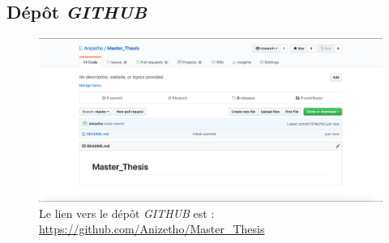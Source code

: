 \documentclass[oneside]{book}
\begin{document}
\begin{appendices}
\section{Dépôt \textit{GITHUB}}
\label{ann:github}
\begin{figure}[htbp]
    \hspace{-1.25cm}
    \includegraphics[scale=0.42]{image/github}
    \caption{Le lien vers le dépôt \textit{GITHUB} est : \url{https://github.com/Anizetho/Master_Thesis}}
    \label{fig:github}
\end{figure}

\newpage



\newpage




\end{appendices}
\end{document}
